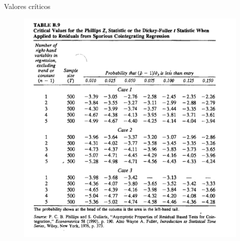 \documentclass[11pt]{beamer}
\begin{document}
\begin{frame}{Valores críticos}
	\begin{figure}
		\centering
		\includegraphics[scale=0.4]{graficos/tabela.png}
	\end{figure}
\end{frame}
\end{document}
